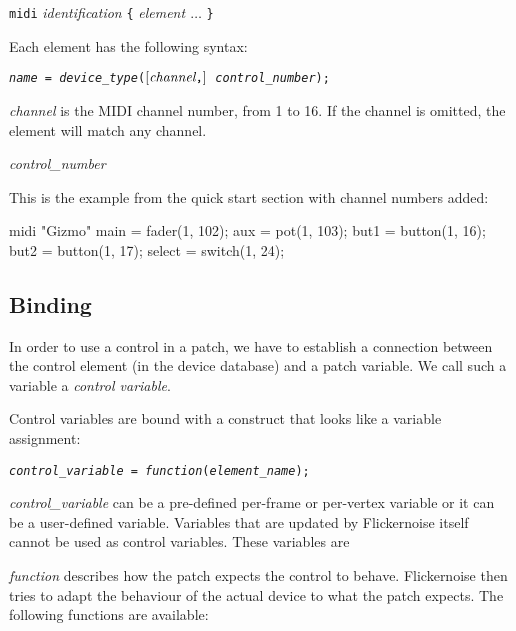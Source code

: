 \documentclass[11pt,a4paper]{article}
\newenvironment{expose}{\vskip3mm\qquad\begin{raggedright}}{%
\end{raggedright}\vskip3mm}
\begin{document}
\begin{expose}
{\tt midi} {\em identification} \verb"{" {\em element $\ldots$} \verb"}"
\end{expose}

Each element has the following syntax:

\begin{expose}
{\tt {\em name} =
  {\em device\_type}($\left[\hbox{\em channel}\verb","\right]$
  {\em control\_number});}
\end{expose}

{\em channel} is the MIDI channel number, from 1 to 16. If the channel
is omitted, the element will match any channel.

{\em control\_number}

This is the example from the quick start section with channel numbers
added:

\begin{listing}{1}
midi "Gizmo" {
	main = fader(1, 102);
	aux = pot(1, 103);
	but1 = button(1, 16);
	but2 = button(1, 17);
	select = switch(1, 24);
}
\end{listing}




\subsection{Binding}
\label{binding}

In order to use a control in a patch, we have to establish a connection
between the control element (in the device database) and a patch
variable. We call such a variable a {\em control variable}.

Control variables are bound with a construct that looks like a
variable assignment:

\begin{expose}
{\tt {\em control\_variable} = {\em function}({\em element\_name});}
\end{expose}

{\em control\_variable} can be a pre-defined per-frame or per-vertex
variable or it can be a user-defined variable. Variables that are
updated by Flickernoise itself cannot be used as control variables.
These variables are


{\em function} describes how the patch expects the control to behave.
Flickernoise then tries to adapt the behaviour of the actual device
to what the patch expects. The following functions are available:
\end{document}
